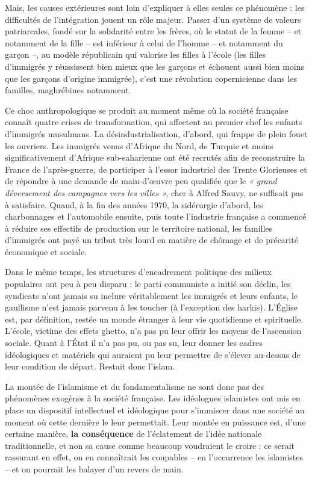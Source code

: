 Mais, les causes extérieures sont loin d'expliquer à elles seules ce
phénomène : les difficultés de l'intégration jouent un rôle majeur.
Passer d'un système de valeurs patriarcales, fondé sur la solidarité
entre les frères, où le statut de la femme -- et notamment de la fille
-- est inférieur à celui de l'homme -- et notamment du garçon --, au
modèle républicain qui valorise les filles à l'école (les filles
d'immigrés y réussissent bien mieux que les garçons et échouent aussi
bien moins que les garçons d'origine immigrée), c'est une révolution
copernicienne dans les familles, maghrébines notamment.

Ce choc anthropologique se produit au moment même où la société
française connaît quatre crises de transformation, qui affectent au
premier chef les enfants d'immigrés musulmans. La désindustrialisation,
d'abord, qui frappe de plein fouet les ouvriers. Les immigrés venus
d'Afrique du Nord, de Turquie et moins significativement d'Afrique
sub-saharienne ont été recrutés afin de reconstruire la France de
l'après-guerre, de participer à l'essor industriel des Trente Glorieuses
et de répondre à une demande de main-d'œuvre peu qualifiée que le
\emph{« grand déversement des campagnes vers les villes »,} cher à
Alfred Sauvy, ne suffisait pas à satisfaire. Quand, à la fin des années
1970, la sidérurgie d'abord, les charbonnages et l'automobile ensuite,
puis toute l'industrie française a commencé à réduire ses effectifs de
production sur le territoire national, les familles d'immigrés ont payé
un tribut très lourd en matière de chômage et de précarité économique et
sociale.

Dans le même temps, les structures d'encadrement politique des milieux
populaires ont peu à peu disparu : le parti communiste a initié son
déclin, les syndicats n'ont jamais su inclure véritablement les immigrés
et leurs enfants, le gaullisme n'est jamais parvenu à les toucher (à
l'exception des harkis). L'Église est, par définition, restée un monde
étranger à leur vie quotidienne et spirituelle. L'école, victime des
effets ghetto, n'a pas pu leur offrir les moyens de l'ascension sociale.
Quant à l'État il n'a pas pu, ou pas su, leur donner les cadres
idéologiques et matériels qui auraient pu leur permettre de s'élever
au-dessus de leur condition de départ. Restait donc l'islam.



La montée de l'islamisme et du fondamentalisme ne sont donc pas des
phénomènes exogènes à la société française. Les idéologues islamistes
ont mis en place un dispositif intellectuel et idéologique pour
s'immiscer dans une société au moment où cette dernière le leur
permettait. Leur montée en puissance est, d'une certaine manière,
\textbf{la conséquence} de l'éclatement de l'idée nationale
traditionnelle, et non sa cause comme beaucoup voudraient le croire : ce
serait rassurant en effet, on en connaîtrait les coupables -- en
l'occurrence les islamistes -- et on pourrait les balayer d'un revers de
main.


